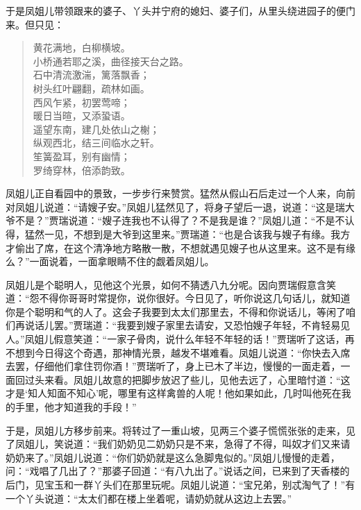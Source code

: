 \documentclass[12pt,oneside]{book}
\newenvironment{shici}{%
\begin{verse}%
\centering\large\hspace{12pt}}%
{\end{verse}}
\begin{document}
于是凤姐儿带领跟来的婆子、丫头并宁府的媳妇、婆子们，从里头绕进园子的便门来。但只见：

\begin{shici}
黄花满地，白柳横坡。\\
小桥通若耶之溪，曲径接天台之路。\\
石中清流激湍，篱落飘香；\\
树头红叶翩翻，疏林如画。\\
西风乍紧，初罢莺啼；\\
暖日当暄，又添蛩语。\\
遥望东南，建几处依山之榭；\\
纵观西北，结三间临水之轩。\\
笙簧盈耳，别有幽情；\\
罗绮穿林，倍添韵致。
\end{shici}


凤姐儿正自看园中的景致，一步步行来赞赏。猛然从假山石后走过一个人来，向前对凤姐儿说道：“请嫂子安。”凤姐儿猛然见了，将身子望后一退，说道：“这是瑞大爷不是？”贾瑞说道：“嫂子连我也不认得了？不是我是谁？”凤姐儿道：“不是不认得，猛然一见，不想到是大爷到这里来。”贾瑞道：“也是合该我与嫂子有缘。我方才偷出了席，在这个清净地方略散一散，不想就遇见嫂子也从这里来。这不是有缘么？”一面说着，一面拿眼睛不住的觑着凤姐儿。

凤姐儿是个聪明人，见他这个光景，如何不猜透八九分呢。因向贾瑞假意含笑道：“怨不得你哥哥时常提你，说你很好。今日见了，听你说这几句话儿，就知道你是个聪明和气的人了。这会子我要到太太们那里去，不得和你说话儿，等闲了咱们再说话儿罢。”贾瑞道：“我要到嫂子家里去请安，又恐怕嫂子年轻，不肯轻易见人。”凤姐儿假意笑道：“一家子骨肉，说什么年轻不年轻的话！”贾瑞听了这话，再不想到今日得这个奇遇，那神情光景，越发不堪难看。凤姐儿说道：“你快去入席去罢，仔细他们拿住罚你酒！”贾瑞听了，身上已木了半边，慢慢的一面走着，一面回过头来看。凤姐儿故意的把脚步放迟了些儿，见他去远了，心里暗忖道：“这才是‘知人知面不知心’呢，哪里有这样禽兽的人呢！他如果如此，几时叫他死在我的手里，他才知道我的手段！”

于是，凤姐儿方移步前来。将转过了一重山坡，见两三个婆子慌慌张张的走来，见了凤姐儿，笑说道：“我们奶奶见二奶奶只是不来，急得了不得，叫奴才们又来请奶奶来了。”凤姐儿说道：“你们奶奶就是这么急脚鬼似的。”凤姐儿慢慢的走着，问：“戏唱了几出了？”那婆子回道：“有八九出了。”说话之间，已来到了天香楼的后门，见宝玉和一群丫头们在那里玩呢。凤姐儿说道：“宝兄弟，别忒淘气了！”有一个丫头说道：“太太们都在楼上坐着呢，请奶奶就从这边上去罢。”
\end{document}
